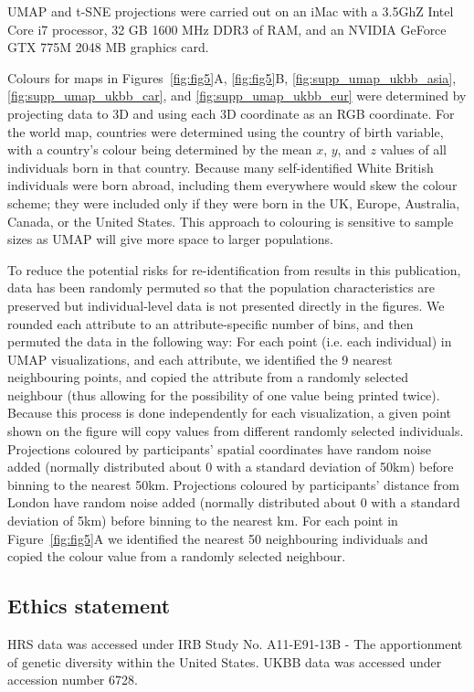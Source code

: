 UMAP and t-SNE projections were carried out on an iMac with a 3.5GhZ Intel Core i7 processor, 32 GB 1600 MHz DDR3 of RAM, and an NVIDIA GeForce GTX 775M 2048 MB graphics card.

Colours for maps in Figures~\ref{fig:fig5}A, \ref{fig:fig5}B, \ref{fig:supp_umap_ukbb_asia}, \ref{fig:supp_umap_ukbb_car}, and \ref{fig:supp_umap_ukbb_eur} were determined by projecting data to 3D and using each 3D coordinate as an RGB coordinate. For the world map, countries were determined using the country of birth variable, with a country's colour being determined by the mean $x$, $y$, and $z$ values of all individuals born in that country. Because many self-identified White British individuals were born abroad, including them everywhere would skew the colour scheme; they were included only if they were born in the UK, Europe, Australia, Canada, or the United States. This approach to colouring is sensitive to sample sizes as UMAP will give more space to larger populations. 

To reduce the potential risks for re-identification from results in this publication, data has been randomly permuted so that the population characteristics are preserved but individual-level data is not presented directly in the figures. We rounded each attribute to an attribute-specific number of bins, and then permuted the data in the following way: 
For each point (i.e. each individual) in UMAP visualizations, and each attribute, we identified the 9 nearest neighbouring points, and copied the attribute from a randomly selected neighbour (thus allowing for the possibility of one value being printed twice).  Because this process is done independently for each visualization, a given point shown on the figure will copy values from different randomly selected individuals. Projections coloured by participants' spatial coordinates have random noise added (normally distributed about 0 with a standard deviation of 50km) before binning to the nearest 50km. Projections coloured by participants' distance from London have random noise added (normally distributed about 0 with a standard deviation of 5km) before binning to the nearest km. For each point in Figure~\ref{fig:fig5}A we identified the nearest 50 neighbouring individuals and copied the colour value from a randomly selected neighbour.

\subsection{Ethics statement}
HRS data was accessed under IRB Study No. A11-E91-13B - The apportionment of genetic diversity within the United States. UKBB data was accessed under accession number 6728.

